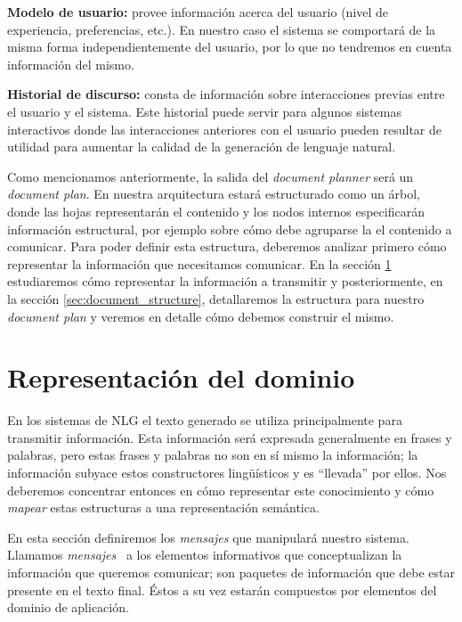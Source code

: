 \bigskip
\noindent
\textbf{Modelo de usuario:} provee información acerca del usuario (nivel de experiencia, preferencias, etc.). En nuestro caso el sistema se comportará de la misma forma independientemente del usuario, por lo que no tendremos en cuenta información del mismo.

\bigskip
\noindent
\textbf{Historial de discurso:} consta de información sobre interacciones previas entre el usuario y el sistema. Este historial puede servir para algunos sistemas interactivos donde las interacciones anteriores con el usuario pueden resultar de utilidad para aumentar la calidad de la generación de lenguaje natural.

\bigskip
Como mencionamos anteriormente, la salida del \textit{document planner} será un \textit{document plan}. En nuestra arquitectura estará estructurado como un árbol, donde las hojas representarán el contenido y los nodos internos especificarán información estructural, por ejemplo sobre cómo debe agruparse la el contenido a comunicar. Para poder definir esta estructura, deberemos analizar primero cómo representar la información que necesitamos comunicar. En la sección \ref{sec:representacion_dominio} estudiaremos cómo representar la información a transmitir y posteriormente, en la sección \ref{sec:document_structure}, detallaremos la estructura para nuestro \emph{document plan} y veremos en detalle cómo debemos construir el mismo.

\section{Representación del dominio}
\label{sec:representacion_dominio}

En los sistemas de NLG el texto generado se utiliza principalmente para transmitir información. Esta información será expresada generalmente en frases y palabras, pero estas  frases y palabras no son en sí mismo la información; la información subyace estos constructores lingüísticos y es ``llevada'' por ellos. Nos deberemos concentrar entonces en cómo representar este conocimiento y cómo \textit{mapear} estas estructuras a una representación semántica. 

En esta sección definiremos los \emph{mensajes} que manipulará nuestro sistema. Llamamos \emph{mensajes}~\cite{reiter_dale} a los elementos informativos que conceptualizan la información que queremos comunicar; son paquetes de información que debe estar presente en el texto final. Éstos a su vez estarán compuestos por elementos del dominio de aplicación.


